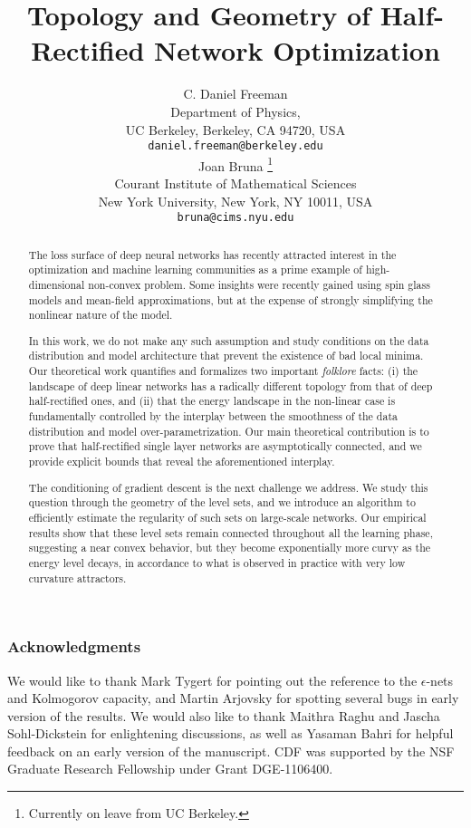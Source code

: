 \documentclass[11pt]{article} %
\title{Topology and Geometry of Half-Rectified Network Optimization }
\author{C. Daniel Freeman \\
Department of Physics, \\
UC Berkeley, Berkeley, CA 94720, USA \\
\texttt{daniel.freeman@berkeley.edu} \\ 
Joan Bruna \thanks{Currently on leave from UC Berkeley.} \\
Courant Institute of Mathematical Sciences \\ 
New York University, New York, NY 10011, USA \\
\texttt{bruna@cims.nyu.edu} \\ 
}
\begin{document}
\maketitle

\begin{abstract}
The loss surface of deep neural networks has recently attracted interest 
in the optimization and machine learning communities as a prime example of 
high-dimensional non-convex problem. Some insights were recently gained using spin glass 
models and mean-field approximations, but at the expense of strongly simplifying the nonlinear nature of the model.

In this work, we do not make any such assumption and study conditions 
on the data distribution and model architecture that prevent the existence 
of bad local minima. Our theoretical work quantifies and formalizes two 
important \emph{folklore} facts: (i) the landscape of deep linear networks has a radically different topology 
from that of deep half-rectified ones, and (ii) that the energy landscape 
in the non-linear case is fundamentally controlled by the interplay between the smoothness of the data distribution and model over-parametrization. Our main theoretical contribution is to prove that half-rectified single layer networks are asymptotically connected, and we provide explicit bounds that reveal the aforementioned interplay.

The conditioning of gradient descent is the next challenge we address. 
We study this question through the geometry of the level sets, and we introduce
an algorithm to efficiently estimate the regularity of such sets on large-scale networks. 
Our empirical results show that these level sets remain connected throughout 
all the learning phase, suggesting a near convex behavior, but they become 
exponentially more curvy as the energy level decays, in accordance to what is observed in practice with 
very low curvature attractors.
\end{abstract}









  



\subsubsection*{Acknowledgments}

We would like to thank Mark Tygert for pointing out 
the reference to the $\epsilon$-nets and Kolmogorov capacity, and Martin Arjovsky for spotting 
several bugs in early version of the results. 
 We would also like to thank Maithra Raghu and Jascha Sohl-Dickstein for enlightening discussions, as well as Yasaman Bahri for helpful feedback on an early version of the manuscript.  CDF was supported by the NSF Graduate Research Fellowship under Grant DGE-1106400.

 




\appendix




\end{document}
